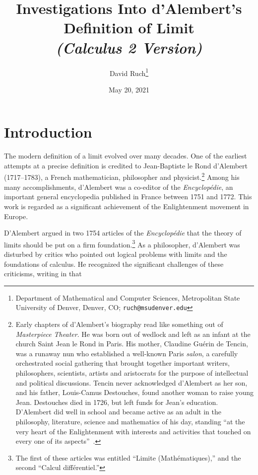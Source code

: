 \documentclass[11pt]{article}%
\begin{document}
\title{Investigations Into d'Alembert's Definition of Limit \\ \emph{(Calculus 2 Version)}}
\author{David Ruch\thanks{Department of Mathematical and Computer Sciences,
Metropolitan State University of Denver, Denver, CO;
\texttt{ruch@msudenver.edu} }}
\date{May 20, 2021}
\maketitle




\section{Introduction}

The modern definition of a limit evolved over many decades. One of the
earliest attempts at a precise definition is credited to Jean-Baptiste le Rond
d'Alembert (1717--1783), a French mathematician, philosopher and physicist.\footnote{Early chapters of d'Alembert's biography read like something out of \emph{Masterpiece Theater}. He was born out of wedlock and left as an infant at the church Saint Jean le Rond in Paris. His mother, Claudine Gu\'{e}rin de Tencin, was a runaway nun who established  a well-known Paris \emph{salon}, a carefully orchestrated social gathering that brought together important writers, philosophers, scientists,  artists  and aristocrats for the purpose of intellectual and political discussions. Tencin never acknowledged d’Alembert as her son, and his father, Louis-Camus Destouches, found another woman to raise young Jean. Destouches died in 1726, but left funds for Jean's education. D'Alembert did well in school and became active as an adult in the philosophy, literature, science and mathematics of his day, standing \textquotedblleft at the very heart of the Enlightenment with interests and activities that touched on every one of its aspects\textquotedblright\ \citep{Hankins1990}.}
Among his many accomplishments, d'Alembert was a co-editor of the
\emph{Encyclop\'{e}die}, an important general encyclopedia published in France
between 1751 and 1772. This work is regarded as a significant achievement of
the Enlightenment movement in Europe.

D'Alembert argued in two 1754 articles of the \emph{Encyclop\'{e}die} that the
theory of limits should be put on a firm foundation.\footnote{The first of these articles was entitled ``Limite (Math\'{e}matiques),'' and the second ``Calcul diff\'{e}rentiel.''} As a philosopher,
d'Alembert was disturbed by critics who pointed out logical problems with
limits and the foundations of calculus. He recognized the significant
challenges of these criticisms, writing in \citep{DAlembert1754b} that
\end{document}

